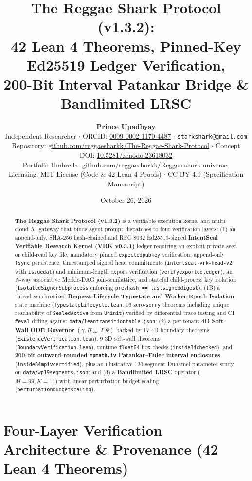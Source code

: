 \documentclass[10pt,letterpaper]{article}
\title{\vspace{-1.3em}\textbf{\large The Reggae Shark Protocol (v1.3.2):\\
42 Lean 4 Theorems, Pinned-Key Ed25519 Ledger Verification,\\
200-Bit Interval Patankar Bridge \& Bandlimited LRSC}\vspace{-0.45em}}
\author{\textbf{Prince Upadhyay}\\
\small Independent Researcher $\cdot$ ORCID: \href{https://orcid.org/0009-0002-1170-4487}{0009-0002-1170-4487} $\cdot$ \texttt{starxshark@gmail.com}\\
\small Repository: \href{https://github.com/reggaesharkk/The-Reggae-Shark-Protocol}{github.com/reggaesharkk/The-Reggae-Shark-Protocol} $\cdot$ Concept DOI: \href{https://doi.org/10.5281/zenodo.23618032}{10.5281/zenodo.23618032}\\
\small Portfolio Umbrella: \href{https://github.com/reggaesharkk/Reggae-shark-universe-}{github.com/reggaesharkk/Reggae-shark-universe-}\\
\small Licensing: MIT License (Code \& 42 Lean 4 Proofs) $\cdot$ CC BY 4.0 (Specification Manuscript)}
\date{\vspace{-0.9em}\small October 26, 2026\vspace{-0.6em}}
\renewcommand{\_}{\textunderscore\allowbreak{}}
\begin{document}
\maketitle

\begin{abstract}
\noindent
\textbf{The Reggae Shark Protocol (v1.3.2)} is a verifiable execution kernel and multi-cloud AI gateway that binds agent prompt dispatches to four verification layers: (1) an append-only, SHA-256 hash-chained and RFC 8032 Ed25519-signed \textbf{IntentSeal Verifiable Research Kernel (VRK v0.3.1)} ledger requiring an explicit private seed or child-read key file, mandatory pinned \texttt{expected\_pubkey} verification, append-only \texttt{fsync} persistence, timestamped signed head commitments (\texttt{intentseal-vrk-head-v2} with \texttt{issued\_at}) and minimum-length export verification (\texttt{verify\_exported\_ledger}), an $N$-way associative Merkle-DAG join-semilattice, and stateful child-process key isolation (\texttt{IsolatedSignerSubprocess} enforcing \texttt{prev\_hash == last\_signed\_digest}); (1B) a thread-synchronized \textbf{Request-Lifecycle Typestate and Worker-Epoch Isolation} state machine (\texttt{TypestateLifecycle.lean}, 16 zero-\texttt{sorry} theorems including unique reachability of \texttt{SealedActive} from \texttt{Uninit}) verified by differential trace testing and CI \texttt{\#eval} diffing against \texttt{data/lean\_transition\_table.json}; (2) a per-tenant \textbf{4D Soft-Wall ODE Governor} $(\gamma, H_{\text{obs}}, \dot{I}, \Psi)$ backed by 17 4D boundary theorems (\texttt{ExistenceVerification.lean}), 9 3D soft-wall theorems (\texttt{BoundaryVerification.lean}), runtime \texttt{float64} box checks (\texttt{inside\_B4\_checked}), and \textbf{200-bit outward-rounded \texttt{mpmath.iv} Patankar--Euler interval enclosures} (\texttt{inside\_B4\_mp\_iv\_certified}), plus an illustrative 120-segment Duhamel parameter study on \texttt{data/wp19\_segments.json}; and (3) a \textbf{Bandlimited LRSC} operator ($M=99, K=11$) with linear perturbation budget scaling (\texttt{perturbation\_budget\_scaling}).
\end{abstract}

\vspace{-0.4em}
\section{Four-Layer Verification Architecture \& Provenance (42 Lean 4 Theorems)}
\vspace{-0.2em}
\end{document}
